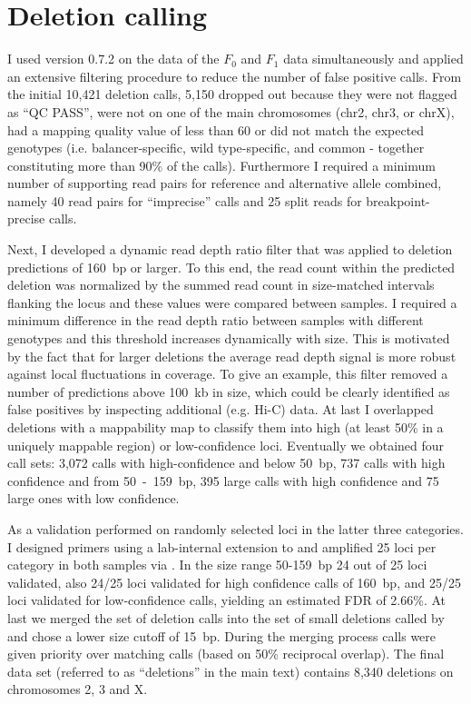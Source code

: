 \section{Deletion calling}
\label{sec:suppl_del}

I used \delly version 0.7.2 on the \wgs data of the $F_0$ and $F_1$ data
simultaneously and applied an extensive filtering procedure to reduce the number
of false positive calls. From the initial 10,421 deletion calls, 5,150 dropped
out because they were not flagged as ``QC PASS'', were not on one of the main
chromosomes (\ac{chr2}, \ac{chr3}, or \ac{chrX}), had a mapping quality value of
less than 60 or did not match the expected genotypes (i.e. balancer-specific,
wild type-specific, and common - together constituting more than 90\% of the calls).
Furthermore I required a minimum number of supporting read pairs for reference
and alternative allele combined, namely 40 read pairs for ``imprecise'' \delly
calls and 25 split reads for breakpoint-precise \delly calls.

Next, I developed a dynamic read depth ratio filter that was applied to deletion
predictions of 160~bp or larger.
To this end, the read count within the predicted deletion was normalized by the
summed read count in size-matched intervals flanking the locus and these values
were compared between samples. I required a minimum difference in the read depth
ratio between samples with different genotypes and this threshold increases
dynamically with \sv size. This is motivated by the fact that for larger deletions
the average read depth signal is more robust against local fluctuations in coverage.
To give an example, this filter removed a number of predictions above 100~kb in
size, which could be clearly identified as false positives by inspecting additional
(e.g. Hi-C) data. At last I overlapped deletions with a mappability map to
classify them into high (at least 50\% in a uniquely mappable region) or
low-confidence loci. Eventually we obtained four call sets: 3,072 calls with
high-confidence and below 50~bp, 737 calls with high confidence and from
50~-~159~bp, 395 large calls with high confidence and 75 large ones with low
confidence.

As a validation \yad performed \pcr on randomly selected loci in the latter three
categories. I designed primers using a lab-internal extension to \primerthree
and \yad amplified 25 loci per category in both samples via \pcr.
In the size range 50-159~bp 24 out of 25 loci validated, also 24/25 loci
validated for high confidence calls of 160~bp, and 25/25 loci validated for
low-confidence calls, yielding an estimated FDR of 2.66\%.
At last we merged the set of \delly deletion calls into the set of small
deletions called by \freebayes and chose a lower size cutoff of 15~bp. During
the merging process \freebayes calls were given priority over matching \delly
calls (based on 50\% reciprocal overlap). The final data set (referred to as
``deletions'' in the main text) contains 8,340 deletions on chromosomes 2, 3 and
X.




